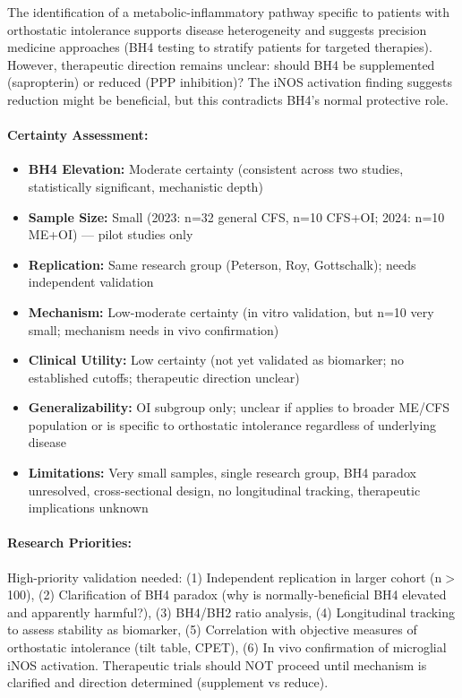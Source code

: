 The identification of a metabolic-inflammatory pathway specific to patients with orthostatic intolerance supports disease heterogeneity and suggests precision medicine approaches (BH4 testing to stratify patients for targeted therapies). However, therapeutic direction remains unclear: should BH4 be supplemented (sapropterin) or reduced (PPP inhibition)? The iNOS activation finding suggests reduction might be beneficial, but this contradicts BH4's normal protective role.

\paragraph{Certainty Assessment:}
\begin{itemize}
    \item \textbf{BH4 Elevation:} Moderate certainty (consistent across two studies, statistically significant, mechanistic depth)
    \item \textbf{Sample Size:} Small (2023: n=32 general CFS, n=10 CFS+OI; 2024: n=10 ME+OI) --- pilot studies only
    \item \textbf{Replication:} Same research group (Peterson, Roy, Gottschalk); needs independent validation
    \item \textbf{Mechanism:} Low-moderate certainty (in vitro validation, but n=10 very small; mechanism needs in vivo confirmation)
    \item \textbf{Clinical Utility:} Low certainty (not yet validated as biomarker; no established cutoffs; therapeutic direction unclear)
    \item \textbf{Generalizability:} OI subgroup only; unclear if applies to broader ME/CFS population or is specific to orthostatic intolerance regardless of underlying disease
    \item \textbf{Limitations:} Very small samples, single research group, BH4 paradox unresolved, cross-sectional design, no longitudinal tracking, therapeutic implications unknown
\end{itemize}

\paragraph{Research Priorities:}
High-priority validation needed: (1) Independent replication in larger cohort (n$>$100), (2) Clarification of BH4 paradox (why is normally-beneficial BH4 elevated and apparently harmful?), (3) BH4/BH2 ratio analysis, (4) Longitudinal tracking to assess stability as biomarker, (5) Correlation with objective measures of orthostatic intolerance (tilt table, CPET), (6) In vivo confirmation of microglial iNOS activation. Therapeutic trials should NOT proceed until mechanism is clarified and direction determined (supplement vs reduce).

